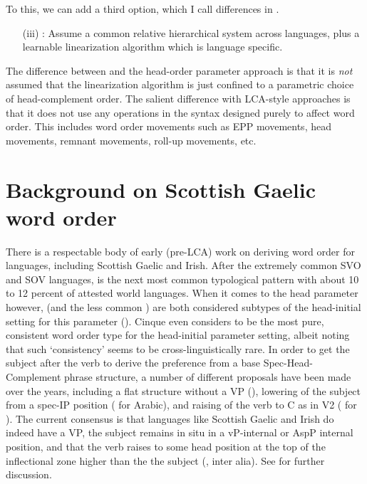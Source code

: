 \documentclass[output=paper,colorlinks,citecolor=brown]{langscibook}
\begin{document}
To this, we can add a third option, which I call differences in .

\begin{itemize}
\item[(iii)]\textit{}: {Assume a common relative hierarchical system across languages, plus a learnable linearization algorithm which is language specific.}
\end{itemize}

The difference between  and the head-order parameter approach is that it is  \textit{not}  assumed that the linearization algorithm is just confined to a parametric choice of head-complement order. The salient difference with LCA-style approaches is that it does not use any operations in the syntax designed purely to affect word order. This includes word order movements such as EPP movements, head movements, remnant movements, roll-up movements, etc. 

\section{Background on Scottish Gaelic word order}\label{sec:ramchand:2}
There is a respectable body of early (pre-LCA) work  on deriving word order for   languages, including Scottish Gaelic and Irish. After the extremely common SVO and SOV languages,  is the next most common typological pattern with about 10 to 12 percent of attested world languages. When it comes to the head parameter however,  (and the less common ) are both considered subtypes of the head-initial setting for this parameter (\cite{cinque17}). Cinque  even considers  to be the most pure, consistent word order type for the head-initial parameter setting, albeit noting that such `consistency' seems to be cross-linguistically rare. In order to get the subject after the verb to derive the  preference from a base Spec-Head-Complement phrase structure, a number of different proposals have been made over the years, including a flat structure without a VP (\citealt{mccloskey:79, chung83}), lowering of the subject from a spec-IP position (\citealt{chung90, shlonsky97} for Arabic), and raising of the verb to C as in V2 (\citealt{emonds80, carnieharleypyatt00} for ). 
The current consensus is that  languages like Scottish Gaelic and Irish do indeed have a VP, the subject remains in situ in a vP-internal or AspP internal position, and that the verb raises to some head position at the top of the inflectional zone higher than the the subject (\citealt{mccloskey:90, mccloskey96svmi, guilfoyle90, noonan94}, inter alia). See \citealt{carnieguilfoyle00intro} for further discussion. 
\end{document}
